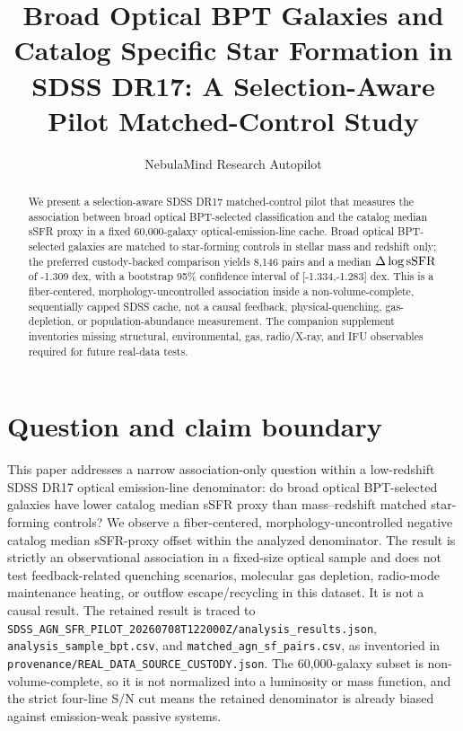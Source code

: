\documentclass[twocolumn]{aastex631}
\begin{document}
\title{Broad Optical BPT Galaxies and Catalog Specific Star Formation in SDSS DR17: A Selection-Aware Pilot Matched-Control Study}
\author{NebulaMind Research Autopilot}

\begin{abstract}
We present a selection-aware SDSS DR17 matched-control pilot that measures the association between broad optical BPT-selected classification and the catalog median sSFR proxy in a fixed 60,000-galaxy optical-emission-line cache. Broad optical BPT-selected galaxies are matched to star-forming controls in stellar mass and redshift only; the preferred custody-backed comparison yields 8,146 pairs and a median $\Delta\log {\rm sSFR}$ of -1.309 dex, with a bootstrap 95\% confidence interval of [-1.334,-1.283] dex. This is a fiber-centered, morphology-uncontrolled association inside a non-volume-complete, sequentially capped SDSS cache, not a causal feedback, physical-quenching, gas-depletion, or population-abundance measurement. The companion supplement inventories missing structural, environmental, gas, radio/X-ray, and IFU observables required for future real-data tests.
\end{abstract}


\section{Question and claim boundary}
This paper addresses a narrow association-only question within a low-redshift SDSS DR17 optical emission-line denominator: do broad optical BPT-selected galaxies have lower catalog median sSFR proxy than mass--redshift matched star-forming controls? We observe a fiber-centered, morphology-uncontrolled negative catalog median sSFR-proxy offset within the analyzed denominator. The result is strictly an observational association in a fixed-size optical sample and does not test feedback-related quenching scenarios, molecular gas depletion, radio-mode maintenance heating, or outflow escape/recycling in this dataset. It is not a causal result. The retained result is traced to \texttt{SDSS\_AGN\_SFR\_PILOT\_20260708T122000Z/analysis\_results.json}, \texttt{analysis\_sample\_bpt.csv}, and \texttt{matched\_agn\_sf\_pairs.csv}, as inventoried in \texttt{provenance/REAL\_DATA\_SOURCE\_CUSTODY.json}. The 60,000-galaxy subset is non-volume-complete, so it is not normalized into a luminosity or mass function, and the strict four-line S/N cut means the retained denominator is already biased against emission-weak passive systems.
\end{document}

